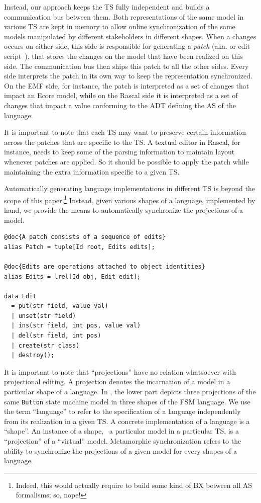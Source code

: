 Instead, our approach keeps the TS fully independent and builds a communication bus between them.
Both representations of the same model in various TS are kept in memory to allow online synchronization of the same models manipulated by different stakeholders in different shapes.
When a changes occurs on either side, this side is responsible for generating a \emph{patch} (aka. \de or edit script~\cite{rozen2017towards}), that stores the changes on the model that have been realized on this side.
The communication bus then ships this patch to all the other sides.
Every side interprets the patch in its own way to keep the representation synchronized.
On the EMF side, for instance, the patch is interpreted as a set of changes that impact an Ecore model, while on the Rascal side it is interpreted as a set of changes that impact a value conforming to the ADT defining the AS of the language.

It is important to note that each TS may want to preserve certain information across the patches that are specific to the TS.
A textual editor in Rascal, for instance, needs to keep some of the parsing information to maintain layout whenever patches are applied.
So it should be possible to apply the patch while maintaining the extra information specific to a given TS.

Automatically generating language implementations in different TS is beyond the scope of this paper.\footnote{Indeed, this would actually require to build some kind of BX between all AS formalisms; so, nope!} Instead, given various shapes of a language, implemented by hand, we provide the means to automatically synchronize the projections of a model.

\begin{lstlisting}[label=lst:delta-adt, caption={CRUD-like \ds structure definition in Rascal}, language=Rascal]
@doc{A patch consists of a sequence of edits}
alias Patch = tuple[Id root, Edits edits];

@doc{Edits are operations attached to object identities}
alias Edits = lrel[Id obj, Edit edit];

data Edit
  = put(str field, value val)
  | unset(str field)
  | ins(str field, int pos, value val)
  | del(str field, int pos)
  | create(str class) 
  | destroy();
\end{lstlisting}

It is important to note that ``projections'' have no relation whatsoever with projectional editing.
A projection denotes the incarnation of a model in a particular shape of a language.
In , the lower part depicts three projections of the same \texttt{Button} state machine model in three shapes of the FSM language.
We use the term ``language'' to refer to the specification of a language independently from its realization in a given TS.
A concrete implementation of a language is a ``shape''.
An instance of a shape, \ie~a particular model in a particular TS, is a ``projection'' of a ``virtual'' model.
Metamorphic synchronization refers to the ability to synchronize the projections of a given model for every shapes of a language.

